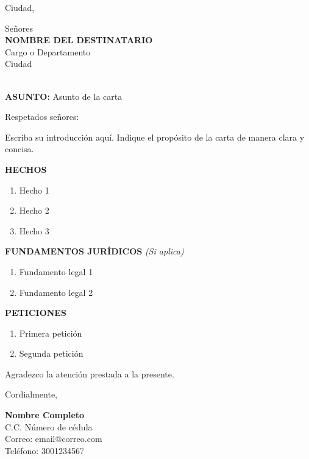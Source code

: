 \documentclass[12pt,letterpaper]{article}
\begin{document}
\begin{flushright}
Ciudad, \Today
\end{flushright}

\vspace{0.5cm}

\noindent
Señores\\
\textbf{NOMBRE DEL DESTINATARIO}\\
Cargo o Departamento\\
Ciudad\\\

\vspace{0.5cm}

\noindent \textbf{ASUNTO:} Asunto de la carta

\vspace{0.5cm}

\noindent Respetados señores:

\vspace{0.3cm}

\noindent Escriba su introducción aquí. Indique el propósito de la carta
de manera clara y concisa.

\vspace{0.3cm}

\noindent\textbf{HECHOS}

\begin{enumerate}
    \item Hecho 1
    \item Hecho 2
    \item Hecho 3
\end{enumerate}

\noindent\textbf{FUNDAMENTOS JURÍDICOS}
\textit{(Si aplica)}

\begin{enumerate}
    \item Fundamento legal 1
    \item Fundamento legal 2
\end{enumerate}

\noindent\textbf{PETICIONES}

\begin{enumerate}
    \item Primera petición
    \item Segunda petición
\end{enumerate}

\vspace{1cm}

Agradezco la atención prestada a la presente.

\vspace{1.5cm}

\noindent Cordialmente,

\vspace{1cm}

\noindent\textbf{Nombre Completo}\\
C.C. Número de cédula\\
Correo: email@correo.com\\
Teléfono: 3001234567
\end{document}
